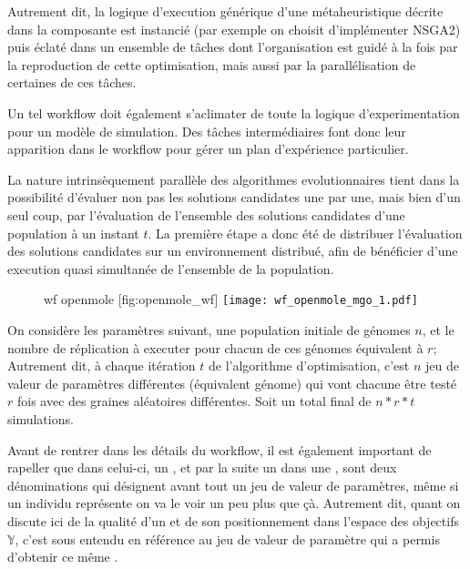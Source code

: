 Autrement dit, la logique d'execution générique d'une métaheuristique décrite dans la composante  est instancié (par exemple on choisit d'implémenter NSGA2) puis éclaté dans un ensemble de tâches dont l'organisation est guidé à la fois par la reproduction de cette optimisation, mais aussi par la parallélisation de certaines de ces tâches.

Un tel workflow doit également s'aclimater de toute la logique d'experimentation pour un modèle de simulation. Des tâches intermédiaires font donc leur apparition dans le workflow pour gérer un plan d'expérience particulier.

La nature intrinsèquement parallèle des algorithmes evolutionnaires tient dans la possibilité d'évaluer non pas les solutions candidates une par une, mais bien d'un seul coup, par l'évaluation de l'ensemble des solutions candidates d'une population à un instant $t$. La première étape a donc été de distribuer l'évaluation des solutions candidates sur un environnement distribué, afin de bénéficier d'une execution quasi simultanée de l'ensemble de la population.

\begin{figure}[H]
	\begin{sidecaption}[fortoc]{wf openmole }[fig:openmole_wf]
		\centering
		\texttt{[image: wf\_openmole\_mgo\_1.pdf]}{
		}
  \end{sidecaption}
\end{figure}

On considère les paramètres suivant, une population initiale de génomes $n$, et le nombre de réplication à executer pour chacun de ces génomes équivalent à $r$; Autrement dit, à chaque itération $t$ de l'algorithme d'optimisation, c'est $n$ jeu de valeur de paramètres différentes (équivalent génome) qui vont chacune être testé $r$ fois avec des graines aléatoires différentes. Soit un total final de $n * r * t$ simulations.

Avant de rentrer dans les détails du workflow, il est également important de rapeller que dans celui-ci, un , et par la suite un  dans une , sont deux dénominations qui désignent avant tout un jeu de valeur de paramètres, même si un individu représente on va le voir un peu plus que çà. Autrement dit, quant on discute ici de la qualité d'un  et de son positionnement dans l'espace des objectifs $\mathbb{Y}$, c'est sous entendu en référence au jeu de valeur de paramètre qui a permis d'obtenir ce même .

